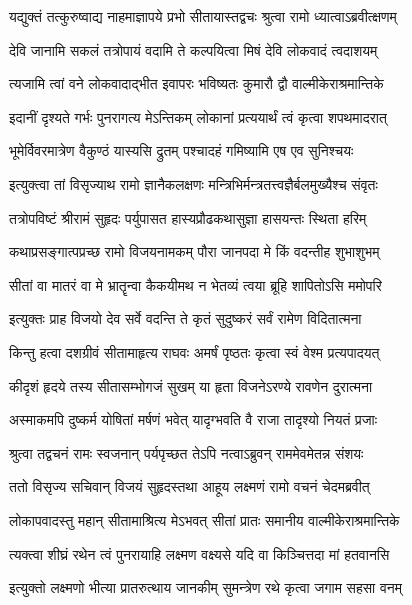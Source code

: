 \twolineshloka
{यद्युक्तं तत्कुरुष्वाद्य नाहमाज्ञापये प्रभो}
{सीतायास्तद्वचः श्रुत्वा रामो ध्यात्वाऽब्रवीत्क्षणम्} %

\twolineshloka
{देवि जानामि सकलं तत्रोपायं वदामि ते}
{कल्पयित्वा मिषं देवि लोकवादं त्वदाशयम्} %

\twolineshloka
{त्यजामि त्वां वने लोकवादाद्भीत इवापरः}
{भविष्यतः कुमारौ द्वौ वाल्मीकेराश्रमान्तिके} %

\twolineshloka
{इदानीं दृश्यते गर्भः पुनरागत्य मेऽन्तिकम्}
{लोकानां प्रत्ययार्थं त्वं कृत्वा शपथमादरात्} %

\twolineshloka
{भूमेर्विवरमात्रेण वैकुण्ठं यास्यसि द्रुतम्}
{पश्चादहं गमिष्यामि एष एव सुनिश्चयः} %

\twolineshloka
{इत्युक्त्वा तां विसृज्याथ रामो ज्ञानैकलक्षणः}
{मन्त्रिभिर्मन्त्रतत्त्वज्ञैर्बलमुख्यैश्च संवृतः} %

\twolineshloka
{तत्रोपविष्टं श्रीरामं सुहृदः पर्युपासत}
{हास्यप्रौढकथासुज्ञा हासयन्तः स्थिता हरिम्} %

\twolineshloka
{कथाप्रसङ्गात्पप्रच्छ रामो विजयनामकम्}
{पौरा जानपदा मे किं वदन्तीह शुभाशुभम्} %

\twolineshloka
{सीतां वा मातरं वा मे भ्रातॄन्वा कैकयीमथ}
{न भेतव्यं त्वया ब्रूहि शापितोऽसि ममोपरि} %

\twolineshloka
{इत्युक्तः प्राह विजयो देव सर्वे वदन्ति ते}
{कृतं सुदुष्करं सर्वं रामेण विदितात्मना} %

\twolineshloka
{किन्तु हत्वा दशग्रीवं सीतामाहृत्य राघवः}
{अमर्षं पृष्ठतः कृत्वा स्वं वेश्म प्रत्यपादयत्} %

\twolineshloka
{कीदृशं हृदये तस्य सीतासम्भोगजं सुखम्}
{या हृता विजनेऽरण्ये रावणेन दुरात्मना} %

\twolineshloka
{अस्माकमपि दुष्कर्म योषितां मर्षणं भवेत्}
{यादृग्भवति वै राजा तादृश्यो नियतं प्रजाः} %

\twolineshloka
{श्रुत्वा तद्वचनं रामः स्वजनान् पर्यपृच्छत}
{तेऽपि नत्वाऽब्रुवन् राममेवमेतन्न संशयः} %

\twolineshloka
{ततो विसृज्य सचिवान् विजयं सुहृदस्तथा}
{आहूय लक्ष्मणं रामो वचनं चेदमब्रवीत्} %

\twolineshloka
{लोकापवादस्तु महान् सीतामाश्रित्य मेऽभवत्}
{सीतां प्रातः समानीय वाल्मीकेराश्रमान्तिके} %

\twolineshloka
{त्यक्त्वा शीघ्रं रथेन त्वं पुनरायाहि लक्ष्मण}
{वक्ष्यसे यदि वा किञ्चित्तदा मां हतवानसि} %

\twolineshloka
{इत्युक्तो लक्ष्मणो भीत्या प्रातरुत्थाय जानकीम्}
{सुमन्त्रेण रथे कृत्वा जगाम सहसा वनम्} %

